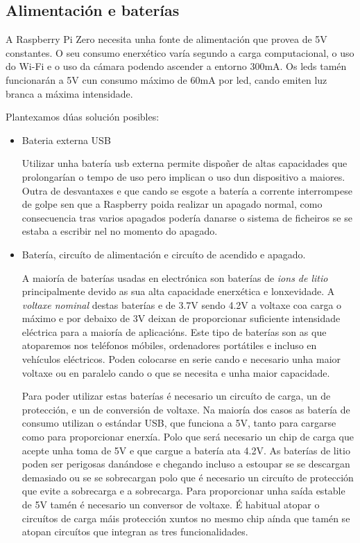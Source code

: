 \subsection{Alimentación e baterías}

A Raspberry Pi Zero necesita unha fonte de alimentación que provea de 5V constantes. O seu consumo enerxético varía segundo a carga computacional, o uso do Wi-Fi e o uso da cámara podendo ascender a entorno 300mA.
Os leds tamén funcionarán a 5V cun consumo máximo de 60mA por led, cando emiten luz branca a máxima intensidade.

Plantexamos dúas solución posibles:
\begin{itemize}
    \item Bateria externa USB

Utilizar unha batería usb externa permite dispoñer de altas capacidades que prolongarían o tempo de uso pero implican o uso dun dispositivo a maiores. Outra de desvantaxes e que cando se esgote a batería a corrente interrompese de golpe sen que a Raspberry poida realizar un apagado normal, como consecuencia tras varios apagados podería danarse o sistema de ficheiros se se estaba a escribir nel no momento do apagado.

    \item Batería, circuíto de alimentación e circuíto de acendido e apagado.

A maioría de baterías usadas en electrónica son baterías de \emph{ions de litio} principalmente devido as sua alta capacidade enerxética e lonxevidade. A \emph{voltaxe nominal} destas baterías e de 3.7V sendo 4.2V a voltaxe coa carga o máximo e por debaixo de 3V deixan de proporcionar suficiente intensidade eléctrica para a maioría de aplicacións. Este tipo de baterías son as que atoparemos nos teléfonos móbiles, ordenadores portátiles e incluso en vehículos eléctricos. Poden colocarse en serie cando e necesario unha maior voltaxe ou en paralelo cando o que se necesita e unha maior capacidade.

Para poder utilizar estas baterías é necesario un circuíto de carga, un de protección, e un de conversión de voltaxe. Na maioría dos casos as batería de consumo utilizan o estándar USB, que funciona a 5V, tanto para cargarse como para proporcionar enerxía. Polo que será necesario un chip de carga que acepte unha toma de 5V e que cargue a batería ata 4.2V. As baterías de litio poden ser perigosas danándose e chegando incluso a estoupar se se descargan demasiado ou se se sobrecargan polo que é necesario un circuíto de protección que evite a sobrecarga e a sobrecarga. Para proporcionar unha saída estable de 5V tamén é necesario un conversor de voltaxe.
É habitual atopar o circuítos de carga máis protección xuntos no mesmo chip aínda que tamén se atopan circuítos que integran as tres funcionalidades.
\end{itemize}
